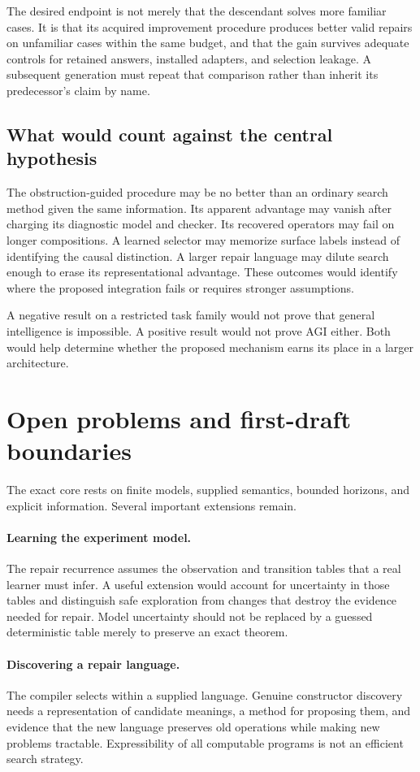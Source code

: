\documentclass[11pt,letterpaper]{article}
\theoremstyle{plain}
\theoremstyle{definition}
\begin{document}
The desired endpoint is not merely that the descendant solves more familiar cases. It is that its acquired improvement procedure produces better valid repairs on unfamiliar cases within the same budget, and that the gain survives adequate controls for retained answers, installed adapters, and selection leakage. A subsequent generation must repeat that comparison rather than inherit its predecessor's claim by name.

\subsection{What would count against the central hypothesis}
The obstruction-guided procedure may be no better than an ordinary search method given the same information. Its apparent advantage may vanish after charging its diagnostic model and checker. Its recovered operators may fail on longer compositions. A learned selector may memorize surface labels instead of identifying the causal distinction. A larger repair language may dilute search enough to erase its representational advantage. These outcomes would identify where the proposed integration fails or requires stronger assumptions.

A negative result on a restricted task family would not prove that general intelligence is impossible. A positive result would not prove AGI either. Both would help determine whether the proposed mechanism earns its place in a larger architecture.

\section{Open problems and first-draft boundaries}\label{sec:limits}
The exact core rests on finite models, supplied semantics, bounded horizons, and explicit information. Several important extensions remain.

\paragraph{Learning the experiment model.}
The repair recurrence assumes the observation and transition tables that a real learner must infer. A useful extension would account for uncertainty in those tables and distinguish safe exploration from changes that destroy the evidence needed for repair. Model uncertainty should not be replaced by a guessed deterministic table merely to preserve an exact theorem.

\paragraph{Discovering a repair language.}
The compiler selects within a supplied language. Genuine constructor discovery needs a representation of candidate meanings, a method for proposing them, and evidence that the new language preserves old operations while making new problems tractable. Expressibility of all computable programs is not an efficient search strategy.
\end{document}
